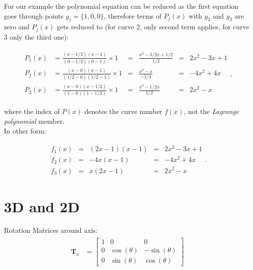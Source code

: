 \documentclass[10pt,b5paper,titlepage]{book}
\begin{document}
For our example the polynomial equation can be reduced as the first equation
goes through points $y_{j} = \{1, 0, 0\}$, therefore terms of $P_{j}(x)$ with
$y_2$ and $y_3$ are zero and $P_{j}(x)$ gets reduced to (for curve 2, only
second term applies, for curve 3 only the third one):

\begin{eqnarray}
    \begin{split}
        P_1(x) &= \frac{(x - 1 / 2)(x - 1)}{(0 - 1 / 2)(0 - 1)} \times 1
               &=& \frac{x^{2} - 3 / 2 x + 1 / 2}{1 / 2}
               &=& 2 x^{2} - 3 x + 1 \\
        P_2(x) &= \frac{(x - 0)(x - 1)}{(1 / 2 - 0)(1 / 2 - 1)} \times 1
               &=& \frac{x^{2} - x}{- 1 / 4}
               &=& -4 x^2 + 4 x \\
        P_3(x) &= \frac{(x - 0)(x - 1 / 2)}{(1 - 0)(1 - 1 / 2)} \times 1
               &=& \frac{x^2 - 1 / 2 x}{1 / 2}
               &=& 2 x^2 - x
    \end{split}
,\end{eqnarray}

where the index of $P(x)$ denotes the curve number $f(x)$, not the
\textit{Lagrange polynomial} member.\\

In other form:

\begin{eqnarray}
    \begin{split}
        f_1(x) &=& (2 x - 1)(x - 1) &=& 2 x^2 - 3 x + 1 \\
        f_2(x) &=& -4 x (x - 1) &=& -4 x^2 + 4 x\\
        f_3(x) &=& x (2 x - 1) &=& 2 x^2 - x
    \end{split}
.\end{eqnarray}


\newpage
\section{3D and 2D}
Rotation Matrices around axis:
\begin{eqnarray}
    \begin{split}
        \mathbf{T}_x &=
        \begin{bmatrix}
            1 & 0 & 0 \\
            0 & \cos(\theta) & -\sin(\theta) \\
            0 & \sin(\theta) & \cos(\theta)
        \end{bmatrix}
    \end{split}
\end{eqnarray}
\end{document}

